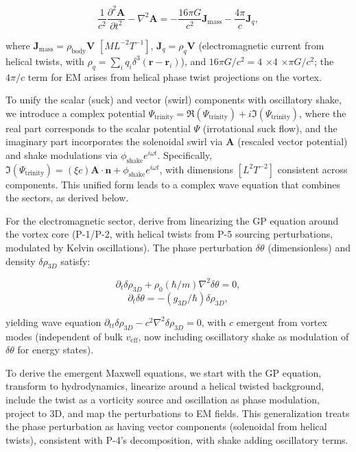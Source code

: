 \begin{equation}
\frac{1}{c^2} \frac{\partial^2 \mathbf{A}}{\partial t^2} - \nabla^2 \mathbf{A} = -\frac{16\pi G}{c^2} \mathbf{J}_{\text{mass}} - \frac{4\pi}{c} \mathbf{J}_q,
\end{equation}

where $\mathbf{J}_{\text{mass}} = \rho_{\text{body}} \mathbf{V}$ $[M L^{-2} T^{-1}]$, $\mathbf{J}_q = \rho_q \mathbf{V}$ (electromagnetic current from helical twists, with $\rho_q = \sum_i q_i \delta^3(\mathbf{r} - \mathbf{r}_i)$), and $16\pi G/c^2 = 4$  $\times 4$  $\times \pi G/c^2$; the $4\pi/c$ term for EM arises from helical phase twist projections on the vortex.

To unify the scalar (suck) and vector (swirl) components with oscillatory shake, we introduce a complex potential $\Psi_{\text{trinity}} = \Re(\Psi_{\text{trinity}}) + i \Im(\Psi_{\text{trinity}})$, where the real part corresponds to the scalar potential $\Psi$ (irrotational suck flow), and the imaginary part incorporates the solenoidal swirl via $\mathbf{A}$ (rescaled vector potential) and shake modulations via $\phi_{\text{shake}} e^{i \omega t}$. Specifically, $\Im(\Psi_{\text{trinity}}) = (\xi c) \mathbf{A} \cdot \mathbf{n} + \phi_{\text{shake}} e^{i \omega t}$, with dimensions $[L^2 T^{-2}]$ consistent across components. This unified form leads to a complex wave equation that combines the sectors, as derived below.

For the electromagnetic sector, derive from linearizing the GP equation around the vortex core (P-1/P-2, with helical twists from P-5 sourcing perturbations, modulated by Kelvin oscillations). The phase perturbation $\delta \theta$ (dimensionless) and density $\delta \rho_{3D}$ satisfy:

\begin{equation}
\partial_t \delta \rho_{3D} + \rho_0 (\hbar / m) \nabla^2 \delta \theta = 0,
\end{equation}
\begin{equation}
\partial_t \delta \theta = - (g_{3D} / \hbar) \delta \rho_{3D},
\end{equation}

yielding wave equation $\partial_{tt} \delta \rho_{3D} - c^2 \nabla^2 \delta \rho_{3D} = 0$, with $c$ emergent from vortex modes (independent of bulk $v_{\text{eff}}$, now including oscillatory shake as modulation of $\delta \theta$ for energy states).

To derive the emergent Maxwell equations, we start with the GP equation, transform to hydrodynamics, linearize around a helical twisted background, include the twist as a vorticity source and oscillation as phase modulation, project to 3D, and map the perturbations to EM fields. This generalization treats the phase perturbation as having vector components (solenoidal from helical twists), consistent with P-4's decomposition, with shake adding oscillatory terms.

